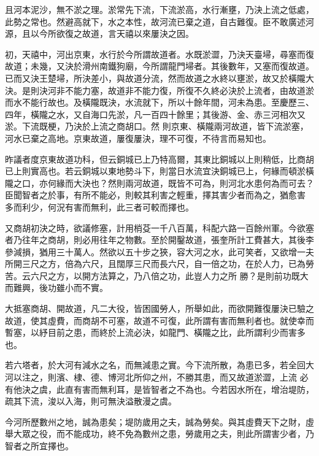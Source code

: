 \begin{pinyinscope}
 且河本泥沙，無不淤之理。淤常先下流，下流淤高，水行漸壅，乃決上流之低處，此勢之常也。然避高就下，水之本性，故河流已棄之道，自古難復。臣不敢廣述河源，且以今所欲復之故道，言天禧以來屢決之因。



 初，天禧中，河出京東，水行於今所謂故道者。水既淤澀，乃決天臺埽，尋塞而復
 故道；未幾，又決於滑州南鐵狗廟，今所謂龍門埽者。其後數年，又塞而復故道。已而又決王楚埽，所決差小，與故道分流，然而故道之水終以壅淤，故又於橫隴大決。是則決河非不能力塞，故道非不能力復，所復不久終必決於上流者，由故道淤而水不能行故也。及橫隴既決，水流就下，所以十餘年間，河未為患。至慶歷三、四年，橫隴之水，又自海口先淤，凡一百四十餘里；其後游、金、赤三河相次又淤。下流既梗，乃決於上流之商胡口。然
 則京東、橫隴兩河故道，皆下流淤塞，河水已棄之高地。京東故道，屢復屢決，理不可復，不待言而易知也。



 昨議者度京東故道功科，但云銅城已上乃特高爾，其東比銅城以上則稍低，比商胡已上則實高也。若云銅城以東地勢斗下，則當日水流宜決銅城已上，何緣而頓淤橫隴之口，亦何緣而大決也？然則兩河故道，既皆不可為，則河北水患何為而可去？臣聞智者之於事，有所不能必，則較其利害之輕重，擇其害少者而為之，猶愈害
 多而利少，何況有害而無利，此三者可較而擇也。



 又商胡初決之時，欲議修塞，計用梢芟一千八百萬，科配六路一百餘州軍。今欲塞者乃往年之商胡，則必用往年之物數。至於開鑿故道，張奎所計工費甚大，其後李參減損，猶用三十萬人。然欲以五十步之狹，容大河之水，此可笑者，又欲增一夫所開三尺之方，倍為六尺，且闊厚三尺而長六尺，自一倍之功，在於人力，已為勞苦。云六尺之方，以開方法算之，乃八倍之功，此豈人力之所
 勝？是則前功既大而難興，後功雖小而不實。



 大抵塞商胡、開故道，凡二大役，皆困國勞人，所舉如此，而欲開難復屢決已驗之故道，使其虛費，而商胡不可塞，故道不可復，此所謂有害而無利者也。就使幸而暫塞，以紓目前之患，而終於上流必決，如龍門、橫隴之比，此所謂利少而害多也。



 若六塔者，於大河有減水之名，而無減患之實。今下流所散，為患已多，若全回大河以注之，則濱、棣、德、博河北所仰之州，不勝其患，而又故道淤澀，上流
 必有他決之虞，此直有害而無利耳，是皆智者之不為也。今若因水所在，增治堤防，疏其下流，浚以入海，則可無決溢散漫之虞。



 今河所歷數州之地，誠為患矣；堤防歲用之夫，誠為勞矣。與其虛費天下之財，虛舉大眾之役，而不能成功，終不免為數州之患，勞歲用之夫，則此所謂害少者，乃智者之所宜擇也。




\end{pinyinscope}
